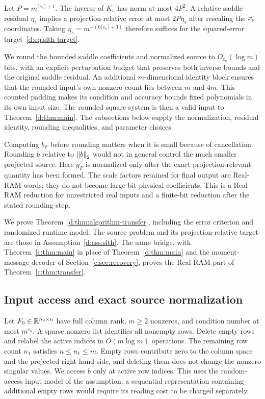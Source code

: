 Let $P=m^{\lceil c_\kappa\rceil+1}$. The inverse of $K_s$ has norm
at most $4P^2$. A relative saddle residual $\eta_s$ implies a
projection-relative error at most $2P\eta_s$ after rescaling the $x_{\rm s}$
coordinates. Taking $\eta_s=m^{-(6\lceil c_\kappa\rceil+3)}$ therefore suffices for the
squared-error target~\eqref{d:eq:slth-target}.

We round the bounded saddle coefficients and normalized source to
$O_{c_\kappa}(\log m)$ bits, with an explicit perturbation budget that preserves
both inverse bounds and the original saddle residual. An additional
$m$-dimensional identity block ensures that the rounded input's own
nonzero count lies between $m$ and $4m$. This counted padding makes its
condition and accuracy bounds fixed polynomials in its own input
size. The rounded square system is then a valid input to
Theorem~\ref{d:thm:main}. The subsections below supply the
normalization, residual identity, rounding inequalities, and parameter
choices.

Computing $b_F$ before rounding matters when it is small because of
cancellation. Rounding $b$ relative to $\left\lVert b\right\rVert_2$ would not in general
control the much smaller projected source. Here $g_F$ is normalized only
after the exact projection-relevant quantity has been formed. The scale
factors retained for final output are Real-RAM words; they do not become
large-bit physical coefficients. This is a Real-RAM reduction for
unrestricted real inputs and a finite-bit reduction after the stated
rounding step.

We prove Theorem~\ref{d:thm:algorithm-transfer}, including the error
criterion and randomized runtime model. The source problem and its
projection-relative target are those in
Assumption~\ref{d:ass:slth}. The same bridge, with
Theorem~\ref{c:thm:main} in place of Theorem~\ref{d:thm:main} and the
moment-message decoder of Section~\ref{c:sec:recovery}, proves the
Real-RAM part of Theorem~\ref{c:thm:transfer}.

\subsection{Input access and exact source normalization}

Let $F_0\in\mathbb R^{n_0\times n}$ have full column rank, $m\ge2$
nonzeros, and condition number at most $m^{c_\kappa}$. A sparse nonzero list
identifies all nonempty rows. Delete empty rows and relabel the active
indices in $O(m\log m)$ operations. The remaining row count $n_1$
satisfies $n\le n_1\le m$. Empty rows contribute zero to the column
space and the projected right-hand side, and deleting them does not
change the nonzero singular values. We access $b$ only at active row
indices. This uses the random-access input model of the assumption;
a sequential representation containing additional empty rows would
require its reading cost to be charged separately.

